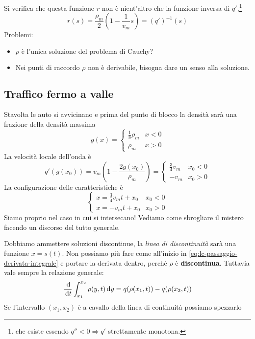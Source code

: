 Si verifica che questa funzione $r$ non è nient'altro che la funzione inversa di $q'$,\footnote{che esiste essendo $q''< 0\Rightarrow q'$ strettamente monotona.}
\begin{equation*}
    r(s) =\frac{\rho _{m}}{2}\left(1-\frac{1}{v_{m}} s\right) =(q')^{-1}(s)
\end{equation*}
Problemi:
\begin{itemize}
    \item $\rho $ è l'unica soluzione del problema di Cauchy?
    \item Nei punti di raccordo $\rho $ non è derivabile, bisogna dare un senso alla soluzione.
\end{itemize}
\subsection{Traffico fermo a valle}

Stavolta le auto si avvicinano e prima del punto di blocco la densità sarà una frazione della densità massima
\begin{equation*}
    g(x) =
    \begin{cases}
        \frac{1}{8} \rho _{m} & x< 0 \\
        \rho _{m}             & x >0
    \end{cases}
\end{equation*}
La velocità locale dell'onda è
\begin{equation*}
    q'(g(x_{0})) =v_{m}\left(1-\frac{2g(x_{0})}{\rho _{m}}\right) =
    \begin{cases}
        \frac{3}{4} v_{m} & x_{0} < 0 \\
        -v_{m}            & x_{0}  >0
    \end{cases}
\end{equation*}
La configurazione delle caratteristiche è
\begin{equation*}
    \begin{cases}
        x=\frac{3}{4} v_{m} t+x_{0} & x_{0} < 0 \\
        x=-v_{m} t+x_{0}            & x_{0}  >0
    \end{cases}
\end{equation*}
Siamo proprio nel caso in cui si intersecano! Vediamo come sbrogliare il mistero facendo un discorso del tutto generale.


Dobbiamo ammettere soluzioni discontinue, la \textit{linea di discontinuità} sarà una funzione $x=s(t)$. Non possiamo più fare come all'inizio in \eqref{eq:lc-passaggio-derivata-integrale} e portare la derivata dentro, perché $\rho $ è \textbf{discontinua}. Tuttavia vale sempre la relazione generale:
\begin{equation*}
    \frac{\,\mathrm d}{\,\mathrm d t}\int ^{x_{2}}_{x_{1}} \rho (y,t) \,\mathrm d y=q(\rho (x_{1} ,t)) -q(\rho (x_{2} ,t))
\end{equation*}
Se l'intervallo $(x_{1} ,x_{2})$ è a cavallo della linea di continuità possiamo spezzarlo

